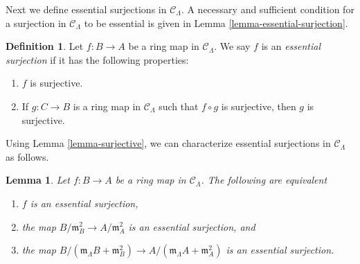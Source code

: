 \documentclass{stacks-project}
\theoremstyle{plain}
\newtheorem{lemma}[subsection]{Lemma}
\theoremstyle{definition}
\newtheorem{definition}[subsection]{Definition}
\theoremstyle{remark}
\numberwithin{equation}{subsection}
\begin{document}
\noindent
Next we define essential surjections in $\mathcal{C}_\Lambda$. A necessary
and sufficient condition for a surjection in $\mathcal{C}_\Lambda$ to be
essential is given in Lemma \ref{lemma-essential-surjection}.

\begin{definition}
\label{definition-essential-surjection}
Let $f: B \to A$ be a ring map in $\mathcal{C}_\Lambda$.  We say $f$
is an {\it essential surjection} if it has the following properties:
\begin{enumerate}
\item $f$ is surjective.
\item If $g: C \to B$ is a ring map in $\mathcal{C}_\Lambda$ such that
$f \circ g$ is surjective, then $g$ is surjective.
\end{enumerate}
\end{definition}

\noindent
Using Lemma \ref{lemma-surjective}, we can characterize
essential surjections in $\mathcal{C}_\Lambda$ as follows.

\begin{lemma}
\label{lemma-essential-surjection-mod-squares}
Let $f: B \to A$ be a ring map in $\mathcal{C}_\Lambda$.
The following are equivalent
\begin{enumerate}
\item $f$ is an essential surjection,
\item the map $B/\mathfrak m_B^2 \to A/\mathfrak m_A^2$ is an essential
surjection, and
\item the map
$B/(\mathfrak m_\Lambda B + \mathfrak m_B^2) \to
A/(\mathfrak m_\Lambda A + \mathfrak m_A^2)$ is an essential surjection.
\end{enumerate}
\end{lemma}
\end{document}
